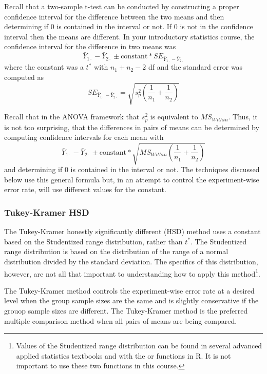 \documentclass[10pt,openany]{book}\usepackage[]{graphicx}\usepackage[]{color}
\begin{document}
Recall that a two-sample t-test can be conducted by constructing a proper confidence interval for the difference between the two means and then determining if 0 is contained in the interval or not.  If 0 is not in the confidence interval then the means are different.  In your introductory statistics course, the confidence interval for the difference in two means was
\[ \bar{Y}_{1\cdot}-\bar{Y}_{2\cdot} \pm \text{constant}*SE_{\bar{Y}_{1\cdot}-\bar{Y}_{2\cdot}} \]
where the constant was a $t^{*}$ with $n_{1}+n_{2}-2$ df and the standard error was computed as
\[ SE_{\bar{Y}_{1\cdot}-\bar{Y}_{2\cdot}} = \sqrt{s_{p}^{2}\left(\frac{1}{n_{1}}+\frac{1}{n_{2}}\right)} \]

Recall that in the ANOVA framework that $s_{p}^{2}$ is equivalent to $MS_{Within}$.  Thus, it is not too surprising, that the differences in pairs of means can be determined by computing confidence intervals for each mean with
\[ \bar{Y}_{1\cdot}-\bar{Y}_{2\cdot} \pm \text{constant}* \sqrt{MS_{Within}\left(\frac{1}{n_{1}}+\frac{1}{n_{2}}\right)} \]
and determining if 0 is contained in the interval or not.  The techniques discussed below use this general formula but, in an attempt to control the experiment-wise error rate, will use different values for the constant.

\subsubsection{Tukey-Kramer HSD}
The Tukey-Kramer honestly significantly different (HSD) method uses a constant based on the Studentized range distribution, rather than $t^{*}$.  The Studentized range distribution is based on the distribution of the range of a normal distribution divided by the standard deviation.  The specifics of this distribution, however, are not all that important to understanding how to apply this method\footnote{Values of the Studentized range distribution can be found in several advanced applied statistics textbooks and with the  or  functions in R.  It is not important to use these two functions in this course.}.

The Tukey-Kramer method controls the experiment-wise error rate at a desired level when the group sample sizes are the same and is slightly conservative if the grouop sample sizes are different.  The Tukey-Kramer method is the preferred multiple comparison method when all pairs of means are being compared.

\end{document}
